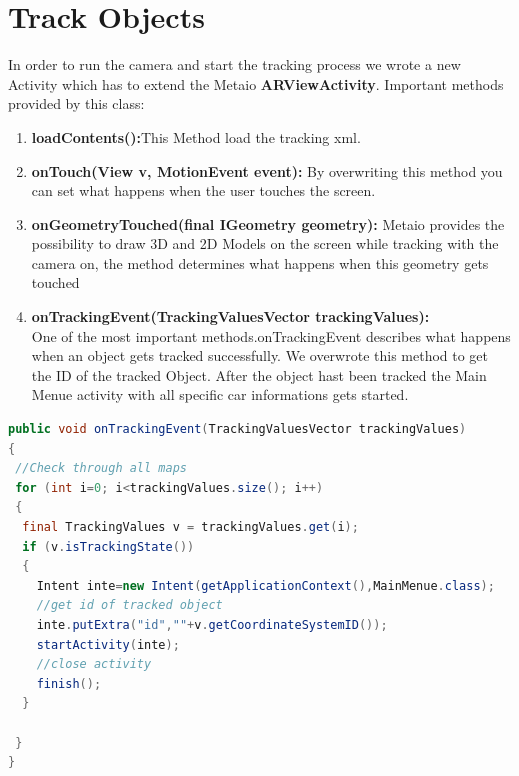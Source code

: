\section{Track Objects}
In order to run the camera and start the tracking process we wrote a new Activity which has to extend the Metaio \textbf{ARViewActivity}. Important methods provided by this class:
\begin{enumerate}
\item \textbf{loadContents():}This Method load the tracking xml.
\item \textbf{onTouch(View v, MotionEvent event):} By overwriting this method you can set what happens when the user touches the screen. 

\item \textbf{onGeometryTouched(final IGeometry geometry):} Metaio provides the possibility to draw 3D and 2D Models on the screen while tracking with the camera on, the method determines what happens when this geometry gets touched 

\item \textbf{onTrackingEvent(TrackingValuesVector trackingValues):} 
\\
One of the most important methods.onTrackingEvent describes what happens when an object gets tracked successfully. We overwrote this method to get the ID of the tracked Object. After the object hast been tracked the Main Menue activity with all specific car informations gets started.   
\end{enumerate} 
\begin{lstlisting}[language=java, caption= where the magic happens]
public void onTrackingEvent(TrackingValuesVector trackingValues)
{
 //Check through all maps 
 for (int i=0; i<trackingValues.size(); i++)
 {
  final TrackingValues v = trackingValues.get(i);
  if (v.isTrackingState())
  {
	Intent inte=new Intent(getApplicationContext(),MainMenue.class);
	//get id of tracked object
	inte.putExtra("id",""+v.getCoordinateSystemID());
	startActivity(inte);
	//close activity
	finish();
  }
				
 }
}
\end{lstlisting}
